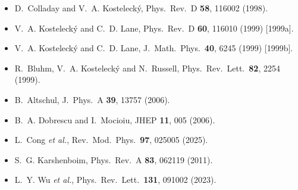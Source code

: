 \documentclass[11pt,a4paper]{article}
\begin{document}
\begin{itemize}[leftmargin=1.2em]
\item D.~Colladay and V.~A. Kostelecký, Phys.\ Rev.\ D \textbf{58}, 116002 (1998).
\item V.~A. Kostelecký and C.~D. Lane, Phys.\ Rev.\ D \textbf{60}, 116010 (1999) [1999a].
\item V.~A. Kostelecký and C.~D. Lane, J.\ Math.\ Phys.\ \textbf{40}, 6245 (1999) [1999b].
\item R.~Bluhm, V.~A. Kostelecký and N.~Russell, Phys.\ Rev.\ Lett.\ \textbf{82}, 2254 (1999).
\item B.~Altschul, J.\ Phys.\ A \textbf{39}, 13757 (2006).
\item B.~A. Dobrescu and I.~Mocioiu, JHEP \textbf{11}, 005 (2006).
\item L.~Cong \textit{et al.}, Rev.\ Mod.\ Phys.\ \textbf{97}, 025005 (2025).
\item S.~G. Karshenboim, Phys.\ Rev.\ A \textbf{83}, 062119 (2011).
\item L.~Y. Wu \textit{et al.}, Phys.\ Rev.\ Lett.\ \textbf{131}, 091002 (2023).
\end{itemize}
\end{document}
